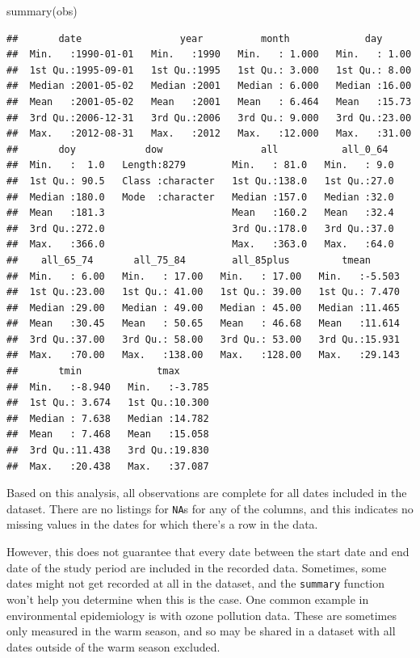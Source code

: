 \documentclass[
]{book}
\newenvironment{Shaded}{\begin{snugshade}}{\end{snugshade}}
\newcommand{\FunctionTok}[1]{\textcolor[rgb]{0.00,0.00,0.00}{#1}}
\newcommand{\NormalTok}[1]{#1}
\begin{document}
\begin{Shaded}
\begin{Highlighting}[]
\FunctionTok{summary}\NormalTok{(obs)}
\end{Highlighting}
\end{Shaded}

\begin{verbatim}
##       date                 year          month             day       
##  Min.   :1990-01-01   Min.   :1990   Min.   : 1.000   Min.   : 1.00  
##  1st Qu.:1995-09-01   1st Qu.:1995   1st Qu.: 3.000   1st Qu.: 8.00  
##  Median :2001-05-02   Median :2001   Median : 6.000   Median :16.00  
##  Mean   :2001-05-02   Mean   :2001   Mean   : 6.464   Mean   :15.73  
##  3rd Qu.:2006-12-31   3rd Qu.:2006   3rd Qu.: 9.000   3rd Qu.:23.00  
##  Max.   :2012-08-31   Max.   :2012   Max.   :12.000   Max.   :31.00  
##       doy            dow                 all           all_0_64   
##  Min.   :  1.0   Length:8279        Min.   : 81.0   Min.   : 9.0  
##  1st Qu.: 90.5   Class :character   1st Qu.:138.0   1st Qu.:27.0  
##  Median :180.0   Mode  :character   Median :157.0   Median :32.0  
##  Mean   :181.3                      Mean   :160.2   Mean   :32.4  
##  3rd Qu.:272.0                      3rd Qu.:178.0   3rd Qu.:37.0  
##  Max.   :366.0                      Max.   :363.0   Max.   :64.0  
##    all_65_74       all_75_84        all_85plus         tmean       
##  Min.   : 6.00   Min.   : 17.00   Min.   : 17.00   Min.   :-5.503  
##  1st Qu.:23.00   1st Qu.: 41.00   1st Qu.: 39.00   1st Qu.: 7.470  
##  Median :29.00   Median : 49.00   Median : 45.00   Median :11.465  
##  Mean   :30.45   Mean   : 50.65   Mean   : 46.68   Mean   :11.614  
##  3rd Qu.:37.00   3rd Qu.: 58.00   3rd Qu.: 53.00   3rd Qu.:15.931  
##  Max.   :70.00   Max.   :138.00   Max.   :128.00   Max.   :29.143  
##       tmin             tmax       
##  Min.   :-8.940   Min.   :-3.785  
##  1st Qu.: 3.674   1st Qu.:10.300  
##  Median : 7.638   Median :14.782  
##  Mean   : 7.468   Mean   :15.058  
##  3rd Qu.:11.438   3rd Qu.:19.830  
##  Max.   :20.438   Max.   :37.087
\end{verbatim}

Based on this analysis, all observations are complete for all dates included
in the dataset. There are no listings for \texttt{NA}s for any of the columns, and
this indicates no missing values in the dates for which there's a row in the data.

However, this does not guarantee that every date between the start date and
end date of the study period are included in the recorded data. Sometimes,
some dates might not get recorded at all in the dataset, and the \texttt{summary}
function won't help you determine when this is the case. One common example in
environmental epidemiology is with ozone pollution data. These are sometimes
only measured in the warm season, and so may be shared in a dataset with all
dates outside of the warm season excluded.
\end{document}
